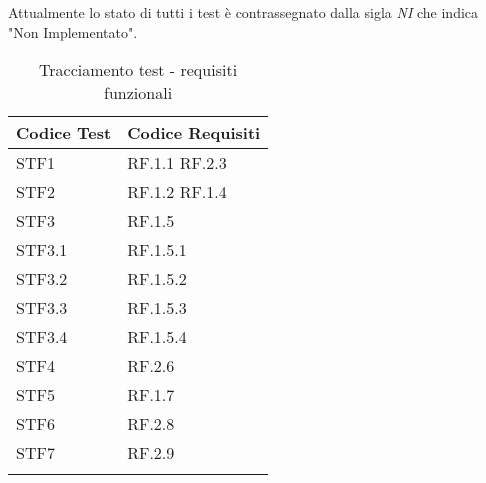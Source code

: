     Attualmente lo stato di tutti i test è contrassegnato dalla sigla \textit{NI} che indica "Non Implementato".

    \begin{longtable}{|p{3cm}|p{10cm}|} \hline
        \textbf{Codice Test} & \textbf{Codice Requisiti} \\ \hline
        STF1 & RF.1.1 RF.2.3\\ \hline
        STF2 & RF.1.2 RF.1.4 \\ \hline
        STF3 & RF.1.5 \\ \hline
        STF3.1 & RF.1.5.1 \\ \hline
        STF3.2 & RF.1.5.2 \\ \hline
        STF3.3 & RF.1.5.3 \\ \hline
        STF3.4 & RF.1.5.4 \\ \hline
        STF4 & RF.2.6 \\ \hline
        STF5 & RF.1.7 \\ \hline
        STF6 & RF.2.8 \\ \hline
        STF7 & RF.2.9 \\ \hline
        \caption{Tracciamento test - requisiti funzionali}
    \end{longtable}
